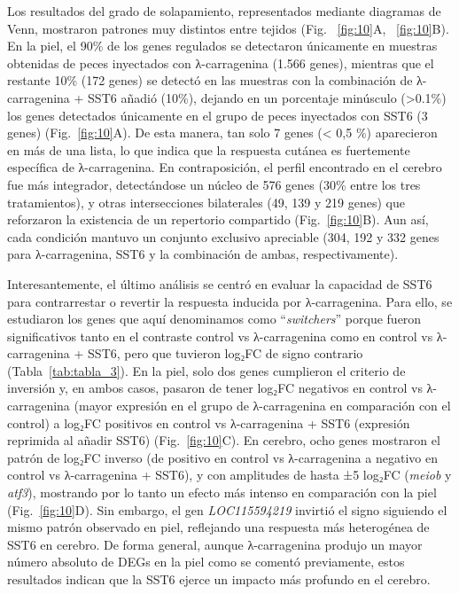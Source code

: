 \documentclass[10pt,a4paper]{article}
\begin{document}
\newpage
Los resultados del grado de solapamiento, representados mediante diagramas de Venn, mostraron patrones muy distintos entre tejidos (Fig. ~\ref{fig:10}A, ~\ref{fig:10}B). En la piel, el 90\% de los genes regulados se detectaron únicamente en muestras obtenidas de peces inyectados con λ-carragenina (1.566 genes), mientras que el restante 10\% (172 genes) se detectó en las muestras con la combinación de λ-carragenina + SST6 añadió (10\%), dejando en un porcentaje minúsculo (>0.1\%) los genes detectados únicamente en el grupo de peces inyectados con SST6 (3 genes) (Fig.~\ref{fig:10}A). De esta manera, tan solo 7 genes (< 0,5 \%) aparecieron en más de una lista, lo que indica que la respuesta cutánea es fuertemente específica de λ-carragenina. En contraposición, el perfil encontrado en el cerebro fue más integrador, detectándose un núcleo de 576 genes (30\% entre los tres tratamientos), y otras intersecciones bilaterales (49, 139 y 219 genes) que reforzaron la existencia de un repertorio compartido (Fig.~\ref{fig:10}B). Aun así, cada condición mantuvo un conjunto exclusivo apreciable (304, 192 y 332 genes para λ-carragenina, SST6 y la combinación de ambas, respectivamente).

Interesantemente, el último análisis se centró en evaluar la capacidad de SST6 para contrarrestar o revertir la respuesta inducida por λ-carragenina. Para ello, se estudiaron los genes que aquí denominamos como “\textit{switchers}” porque fueron significativos tanto en el contraste control vs λ-carragenina como en control vs λ-carragenina + SST6, pero que tuvieron log₂FC de signo contrario (Tabla~\ref{tab:tabla_3}). En la piel, solo dos genes cumplieron el criterio de inversión y, en ambos casos, pasaron de tener log₂FC negativos en control vs λ-carragenina (mayor expresión en el grupo de λ-carragenina en comparación con el control) a log₂FC positivos en control vs λ-carragenina + SST6 (expresión reprimida al añadir SST6) (Fig.~\ref{fig:10}C). En cerebro, ocho genes mostraron el patrón de log₂FC inverso (de positivo en control vs λ-carragenina a negativo en control vs λ-carragenina + SST6), y con amplitudes de hasta ±5 log₂FC (\textit{meiob} y \textit{atf3}), mostrando por lo tanto un efecto más intenso en comparación con la piel (Fig.~\ref{fig:10}D). Sin embargo, el gen \textit{LOC115594219} invirtió el signo siguiendo el mismo patrón observado en piel, reflejando una respuesta más heterogénea de SST6 en cerebro. De forma general, aunque λ-carragenina produjo un mayor número absoluto de DEGs en la piel como se comentó previamente, estos resultados indican que la SST6 ejerce un impacto más profundo en el cerebro.
\end{document}
